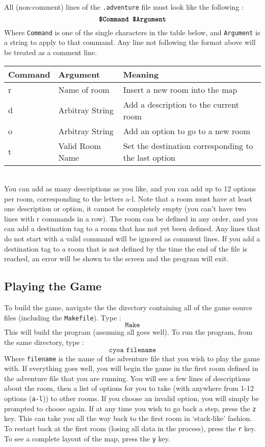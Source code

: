 \documentclass[a4paper,11pt]{article}
\begin{document}
    All (non-comment) lines of the \texttt{.adventure} file must look like the following : \\
    \[ \text{\textbf{ \texttt{\$Command \$Argument}} } \]
    Where \texttt{Command} is one of the single characters in the table below, and \texttt{Argument} is a string to apply to that command. Any line not following the format above will be treated as a comment line. \\

    \begin{tabular}{l | l | l}
    \textbf{Command} & \textbf{Argument} & \textbf{Meaning} \\ \hline
    r                & Name of room      & Insert a new room into the map \\
    d                & Arbitray String   & Add a description to the current room \\
    o                & Arbitray String   & Add an option to go to a new room \\
    t                & Valid Room Name   & Set the destination corresponding to the last option \\
    \end{tabular} \\

    You can add as many descriptions as you like, and you can add up to 12 options per room, corresponding to the letters a-l. Note that a room must have at least one description or option, it cannot be completely empty (you can't have two lines with r commands in a row). The room can be defined in any order, and you can add a destination tag to a room that has not yet been defined. Any lines that do not start with a valid command will be ignored as comment lines. If you add a destination tag to a room that is not defined by the time the end of the file is reached, an error will be shown to the screen and the program will exit.

    \subsection{Playing the Game}
    To build the game, navigate the the directory containing all of the game source files (including the \texttt{Makefile}). Type :
    \[ \texttt{Make} \]
    This will build the program (assuming all goes well). To run the program, from the same directory, type :
    \[ \texttt{cyoa filename} \]
    Where \texttt{filename} is the name of the adventure file that you wish to play the game with. If everything goes well, you will begin the game in the first room defined in the adventure file that you are running. You will see a few lines of descriptions about the room, then a list of options for you to take (with anywhere from 1-12 options (\texttt{a-l})) to other rooms. If you choose an invalid option, you will simply be prompted to choose again. If at any time you wish to go back a step, press the \texttt{z} key. This can take you all the way back to the first room in `stack-like' fashion. To restart back at the first room (losing all data in the process), press the \texttt{r} key. To see a complete layout of the map, press the \texttt{y} key.
    
\end{document}
